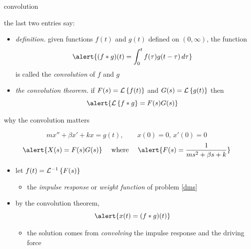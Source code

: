 \documentclass[urlcolor=blue,dvipsnames]{beamer}
\begin{document}
\begin{frame}{convolution}

the last two entries say:

\bigskip
\begin{itemize}
\item \emph{definition.}  given functions $f(t)$ and $g(t)$ defined on $(0,\infty)$, the function
    $$\alert{(f \ast g)(t) = \int_0^t f(\tau) g(t-\tau)\,d\tau}$$
is called the \alert{\emph{convolution}} of $f$ and $g$
\item \emph{the convolution theorem.}  if $F(s)=\mathcal{L}\left\{f(t)\right\}$ and $G(s)=\mathcal{L}\left\{g(t)\right\}$ then
    $$\alert{\LL{f \ast g} = F(s) G(s)}$$
\end{itemize}
\end{frame}


\begin{frame}{why the convolution matters}

\begin{equation}
m x'' + \beta x' + k x = g(t), \qquad x(0)=0, \, x'(0)=0 \label{dms} \tag{$\ast$}
\end{equation}
     $$\alert{X(s) = F(s) G(s)} \quad \text{ where } \quad \alert{F(s) = \frac{1}{ms^2+\beta s+k}}$$

\begin{itemize}
\item let $f(t)=\mathcal{L}^{-1}\left\{F(s)\right\}$
    \begin{itemize}
    \item the \emph{impulse response} or \emph{weight function} of problem \eqref{dms}
    \end{itemize}
\item by the convolution theorem,
    $$\alert{x(t) = (f * g)(t)}$$

\vspace{-2mm}
    \begin{itemize}
    \item the solution comes from \emph{convolving} the impulse response and the driving force
    \end{itemize}
\end{itemize}
\end{frame}
\end{document}
